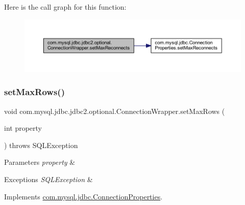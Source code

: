 Here is the call graph for this function\+:
\nopagebreak
\begin{figure}[H]
\begin{center}
\leavevmode
\includegraphics[width=350pt]{classcom_1_1mysql_1_1jdbc_1_1jdbc2_1_1optional_1_1_connection_wrapper_aeed825d6bd8942b00610c43d8a8c82ef_cgraph}
\end{center}
\end{figure}
\mbox{\label{classcom_1_1mysql_1_1jdbc_1_1jdbc2_1_1optional_1_1_connection_wrapper_a21b7e7ac26548d9266485dce22f5af21}} 
\subsubsection{\texorpdfstring{set\+Max\+Rows()}{setMaxRows()}}
{\footnotesize\ttfamily void com.\+mysql.\+jdbc.\+jdbc2.\+optional.\+Connection\+Wrapper.\+set\+Max\+Rows (\begin{DoxyParamCaption}\item[{int}]{property }\end{DoxyParamCaption}) throws S\+Q\+L\+Exception}


\begin{DoxyParams}{Parameters}
{\em property} & \\
\hline
\end{DoxyParams}

\begin{DoxyExceptions}{Exceptions}
{\em S\+Q\+L\+Exception} & \\
\hline
\end{DoxyExceptions}


Implements \mbox{\hyperlink{interfacecom_1_1mysql_1_1jdbc_1_1_connection_properties_afbeac8befbc0374361e27aa4fead424a}{com.\+mysql.\+jdbc.\+Connection\+Properties}}.

